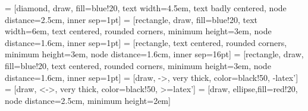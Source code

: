 % 
% 
% 



 = [diamond, draw, fill=blue!20,
    text width=4.5em, text badly centered, node distance=2.5cm, inner sep=1pt]
 = [rectangle, draw, fill=blue!20,
    text width=6em, text centered, rounded corners, minimum height=3em, node distance=1.6cm, inner sep=1pt]
 = [rectangle, 
    text centered, rounded corners, minimum height=3em, node distance=1.6cm, inner sep=16pt]
 = [rectangle, draw, fill=blue!20,
    text centered, rounded corners, minimum height=3em, node distance=1.6cm, inner sep=1pt]
 = [draw, ->, very thick, color=black!50, -latex']
 = [draw, <->, very thick, color=black!50, >=latex']
 = [draw, ellipse,fill=red!20, node distance=2.5cm,
    minimum height=2em]

